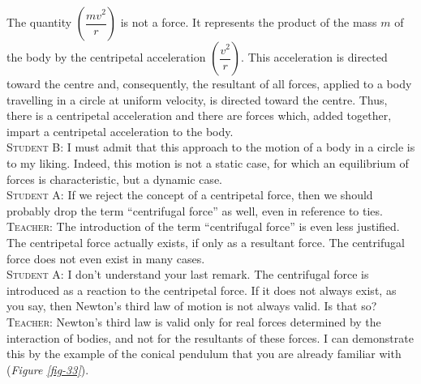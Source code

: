 \documentclass[a4paper,sfsidenotes]{tufte-book}
\begin{document}
The quantity $\left(\dfrac{mv^{2}}{r} \right)$  is not a force. It represents the product of the mass $m$ of the body by the centripetal acceleration $\left(\dfrac{v^{2}}{r}\right)$. This acceleration is directed toward the centre and, consequently, the resultant of all forces, applied to a body travelling in a circle at uniform velocity, is directed toward the centre. Thus, there is a centripetal acceleration and there are forces which, added together, impart a centripetal acceleration to the body.\\
\textsc{Student B:} I must admit that this approach to the motion of a body in a circle is to my liking. Indeed, this motion is not a static case, for which an equilibrium of forces is characteristic, but a dynamic case.
\\
\textsc{Student A:} If we reject the concept of a centripetal force, then we should probably drop the term ``centrifugal force'' as well, even in reference to ties.
\\
\textsc{Teacher:} The introduction of the term ``centrifugal force'' is even less justified. The centripetal force actually exists, if only as a resultant force. The centrifugal force does not even exist in many cases.
\\
\textsc{Student A:} I don't understand your last remark. The centrifugal force is introduced as a reaction to the centripetal force. If it does not always exist, as you say, then Newton's third law of motion is not always valid. Is that so?
\\
\textsc{Teacher:} Newton's third law is valid only for real forces determined by the interaction of bodies, and not for the resultants of these forces. I can demonstrate this by the example of the conical pendulum that you are already familiar with (\emph{Figure \ref{fig-33}}). 
\end{document}
